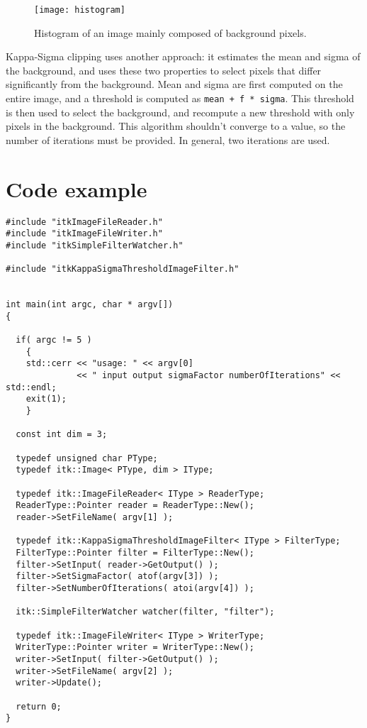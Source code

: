 \documentclass{InsightArticle}
\begin{document}
\begin{figure}[htbp]
\centering
\texttt{[image: histogram]}
\caption{Histogram of an image mainly composed of background pixels.\label{histogram}}
\end{figure}

Kappa-Sigma clipping uses another approach: it estimates the mean and
sigma of the background, and uses these two properties to select
pixels that differ significantly from the background.  Mean and sigma
are first computed on the entire image, and a threshold is computed as
\verb$mean + f * sigma$.  This threshold is then used to select the
background, and recompute a new threshold with only pixels in the
background.  This algorithm shouldn't converge to a value, so the
number of iterations must be provided.  In general, two iterations are
used.

\section{Code example}

\small \begin{verbatim}
#include "itkImageFileReader.h"
#include "itkImageFileWriter.h"
#include "itkSimpleFilterWatcher.h"

#include "itkKappaSigmaThresholdImageFilter.h"


int main(int argc, char * argv[])
{

  if( argc != 5 )
    {
    std::cerr << "usage: " << argv[0]
              << " input output sigmaFactor numberOfIterations" << std::endl;
    exit(1);
    }

  const int dim = 3;
  
  typedef unsigned char PType;
  typedef itk::Image< PType, dim > IType;

  typedef itk::ImageFileReader< IType > ReaderType;
  ReaderType::Pointer reader = ReaderType::New();
  reader->SetFileName( argv[1] );

  typedef itk::KappaSigmaThresholdImageFilter< IType > FilterType;
  FilterType::Pointer filter = FilterType::New();
  filter->SetInput( reader->GetOutput() );
  filter->SetSigmaFactor( atof(argv[3]) );
  filter->SetNumberOfIterations( atoi(argv[4]) );

  itk::SimpleFilterWatcher watcher(filter, "filter");

  typedef itk::ImageFileWriter< IType > WriterType;
  WriterType::Pointer writer = WriterType::New();
  writer->SetInput( filter->GetOutput() );
  writer->SetFileName( argv[2] );
  writer->Update();

  return 0;
}
\end{verbatim} \normalsize
\end{document}
